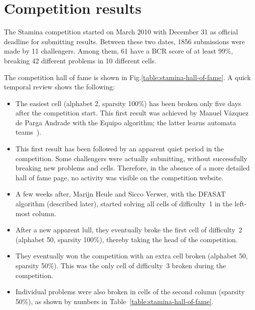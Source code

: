 \section{Competition results\label{section:stamina-results}}

The Stamina competition started on March 2010 with December 31 as official deadline for submitting results. Between these two dates, 1856 submissions were made by 11 challengers. Among them, 61 have a BCR score of at least 99\%, breaking 42 different problems in 10 different cells.

The competition hall of fame is shown in Fig.\ref{table:stamina-hall-of-fame}. A quick temporal review shows the following:
\begin{itemize} 
\item The easiest cell (alphabet 2, sparsity 100\%) has been broken only five days after the competition start. This first result was achieved by Manuel V\'azquez de Parga Andrade with the Equipo algorithm; the latter learns automata teams~\cite{Garcia:2010}). 
\item This first result has been followed by an apparent quiet period in the competition. Some challengers were actually submitting, without successfully breaking new problems and cells. Therefore, in the absence of a more detailed hall of fame page, no activity was visible on the competition website. 
\item A few weeks after, Marijn Heule and Sicco Verwer, with the DFASAT algorithm (described later), started solving all cells of difficulty~1 in the left-most column. 
\item After a new apparent lull, they eventually broke the first cell of difficulty~2 (alphabet 50, sparsity 100\%), thereby taking the head of the competition. 
\item They eventually won the competition with an extra cell broken (alphabet 50, sparsity 50\%). This was the only cell of difficulty~3 broken during the competition. 
\item Individual problems were also broken in cells of the second column (sparsity 50\%), as shown by numbers in Table~\ref{table:stamina-hall-of-fame}.
\end{itemize}

